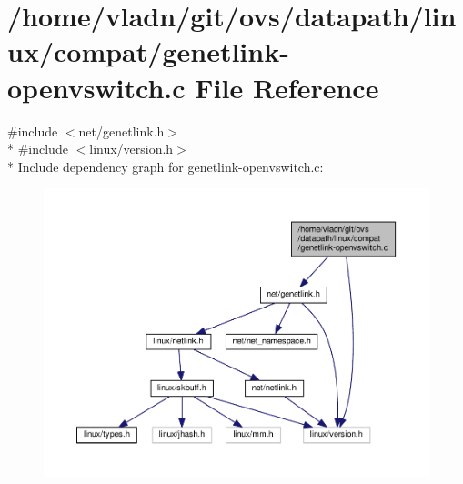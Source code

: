 \hypertarget{compat_2genetlink-openvswitch_8c}{}\section{/home/vladn/git/ovs/datapath/linux/compat/genetlink-\/openvswitch.c File Reference}
\label{compat_2genetlink-openvswitch_8c}
{\ttfamily \#include $<$net/genetlink.\+h$>$}\\*
{\ttfamily \#include $<$linux/version.\+h$>$}\\*
Include dependency graph for genetlink-\/openvswitch.c\+:
\nopagebreak
\begin{figure}[H]
\begin{center}
\leavevmode
\includegraphics[width=350pt]{compat_2genetlink-openvswitch_8c__incl}
\end{center}
\end{figure}
